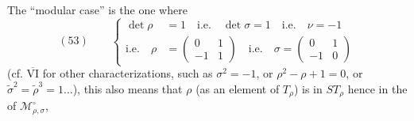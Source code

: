 The ``modular case'' is the one where
\[
(53)\qquad
\left\{\begin{aligned}
\det\rho&=1\quad\text{i.e.}\quad\det\sigma=1
\quad\text{i.e.}\quad\nu=-1\\
\text{i.e.}\quad\rho&=\begin{pmatrix}0&1\\-1&1\end{pmatrix}
\quad\text{i.e.}\quad\sigma=\begin{pmatrix}0&1\\-1&0\end{pmatrix}
\end{aligned}\right.
\]
(cf. \uline{$\overline{\mathrm{VI}}$} for other
characterizations, such as
$\sigma^2=-1$, or $\rho^2-\rho+1=0$, or
$\widetilde\sigma^2=\widetilde\rho^3=1\ldots$),
this also means that $\rho$ (as an element of $T_\rho$)
is in $ST_\rho$ hence in the  of $\mathcal M_{\rho,\sigma}^{\circ}$,

\par{}